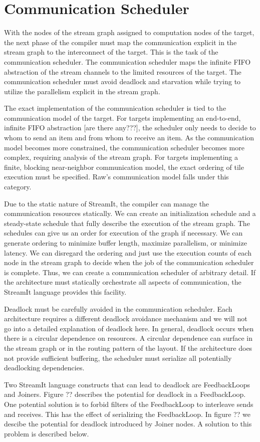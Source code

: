\section{Communication Scheduler}
\label{sec:communic}

With the nodes of the stream graph assigned to computation nodes of
the target, the next phase of the compiler must map the communication
explicit in the stream graph to the interconnect of the target.  This
is the task of the communication scheduler.  The communication
scheduler maps the infinite FIFO abstraction of the stream channels to
the limited resources of the target.  The communication scheduler must
avoid deadlock and starvation while trying to utilize the parallelism
explicit in the stream graph.

The exact implementation of the communication scheduler is tied to the
communication model of the target.  For targets implementing an
end-to-end, infinite FIFO abstraction [are there any???], the
scheduler only needs to decide to whom to send an item and from whom
to receive an item.  As the communication model becomes more
constrained, the communication scheduler becomes more complex,
requiring analysis of the stream graph. For targets implementing a
finite, blocking near-neighbor communication model, the exact ordering
of tile execution must be specified.  Raw's communication model falls
under this category.

Due to the static nature of StreamIt, the compiler can manage the
communication resources statically.  We can create an initialization
schedule and a steady-state schedule that fully describe the execution
of the stream graph.  The schedules can give us an order for execution
of the graph if necessary.  We can generate ordering to minimize
buffer length, maximize parallelism, or minimize latency.  We can
disregard the ordering and just use the execution counts of each node
in the stream graph to decide when the job of the communication
scheduler is complete.  Thus, we can create a communication scheduler
of arbitrary detail.  If the architecture must statically orchestrate
all aspects of communication, the StreamIt language provides this
facility.

Deadlock must be carefully avoided in the communication
scheduler. Each architecture requires a different deadlock avoidance
mechanism and we will not go into a detailed explanation of deadlock
here.  In general, deadlock occurs when there is a circular dependence
on resources.  A circular dependence can surface in the stream graph
or in the routing pattern of the layout.  If the architecture does not
provide sufficient buffering, the scheduler must serialize all
potentially deadlocking dependencies.

Two StreamIt language constructs that can lead to deadlock are
FeedbackLoops and Joiners. Figure ?? describes the potential for
deadlock in a FeedbackLoop.  One potential solution is to forbid
filters of the FeedbackLoop to interleave sends and receives.  This
has the effect of serializing the FeedbackLoop. In figure ?? we
descibe the potential for deadlock introduced by Joiner nodes.  A
solution to this problem is described below.
